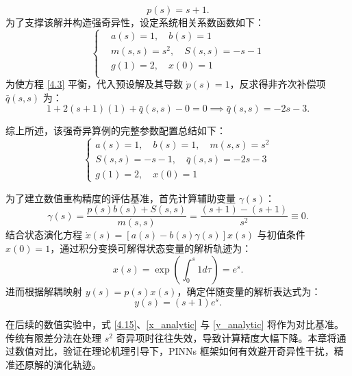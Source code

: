 \documentclass{GZUbachelorthesis}
\begin{document}
\begin{equation}\label{4.15}
	p(s) = s+1.
\end{equation}
为了支撑该解并构造强奇异性，设定系统相关系数函数如下：
\begin{equation}\label{4.16}
	\left\{
		\begin{aligned}
			&a(s) = 1, \quad b(s) = 1 \\
			&m(s,s) = s^2, \quad S(s,s) = -s - 1 \\
			&g(1) = 2, \quad x(0) = 1\\
		\end{aligned}
	\right.
\end{equation}
为使方程 \eqref{4.3} 平衡，代入预设解及其导数 $\dot{p}(s)=1$，反求得非齐次补偿项 $\bar{q}(s,s)$ 为：
\begin{equation}
	1 + 2(s+1)(1) + \bar{q}(s,s) - 0 = 0 \implies \bar{q}(s,s) = -2s - 3.
\end{equation}

综上所述，该强奇异算例的完整参数配置总结如下：
\begin{equation}\label{example_params}
	\begin{cases}
		a(s) = 1, \quad b(s) = 1, \quad m(s,s) = s^2 \\
		S(s,s) = -s - 1, \quad \bar{q}(s,s) = -2s - 3 \\
		g(1) = 2, \quad x(0) = 1
	\end{cases}
\end{equation}

为了建立数值重构精度的评估基准，首先计算辅助变量 $\gamma(s)$：
\begin{equation}
	\gamma(s) = \frac{p(s)b(s) + S(s,s)}{m(s,s)} = \frac{(s+1) - (s+1)}{s^2} \equiv 0.
\end{equation}
结合状态演化方程 $\dot{x}(s) = [a(s) - b(s)\gamma(s)]x(s)$ 与初值条件 $x(0) = 1$，通过积分变换可解得状态变量的解析轨迹为：
\begin{equation}\label{x_analytic}
	x(s) = \exp\left( \int_0^s 1 d\tau \right) = e^s.
\end{equation}
进而根据解耦映射 $y(s) = p(s)x(s)$，确定伴随变量的解析表达式为：
\begin{equation}\label{y_analytic}
	y(s) = (s+1)e^s.
\end{equation}

在后续的数值实验中，式 \eqref{4.15}、\eqref{x_analytic} 与 \eqref{y_analytic} 将作为对比基准。传统有限差分法在处理 $s^2$ 奇异项时往往失效，导致计算精度大幅下降。本章将通过数值对比，验证在理论机理引导下，PINNs 框架如何有效避开奇异性干扰，精准还原解的演化轨迹。
\end{document}
